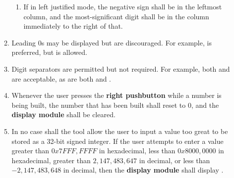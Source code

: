 \begin{enumerate}
\begin{enumerate}
\begin{enumerate}
                \item If in left justified mode, the negative sign shall be in the leftmost column, and the most-significant digit shall be in the column immediately to the right of that.
            \end{enumerate}
        \item Leading 0s may be displayed but are discouraged.
            For example,  is preferred, but  is allowed.
        \item Digit separators are permitted but not required.
            For example, both  and  are acceptable, as are both  and .
        \item \label{spec:clearNumber} Whenever the user presses the \textbf{right pushbutton} while a number is being built, the number that has been built shall reset to 0, and the \textbf{display module} shall be cleared.
        \item \label{spec:tooBig} In no case shall the tool allow the user to input a value too great to be stored as a 32-bit signed integer.
            If the user attempts to enter a value greater than $0x7FFF,FFFF$ in hexadecimal, less than $0x8000,0000$ in hexadecimal, greater than $2,147,483,647$ in decimal, or less than $-2,147,483,648$ in decimal, then the \textbf{display module} shall display .
            \begin{itemize}

\end{itemize}
\end{enumerate}
\end{enumerate}
